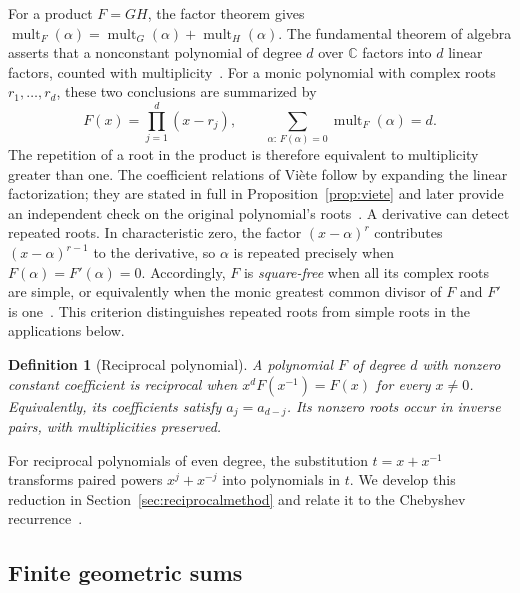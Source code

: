 \documentclass[11pt,a4paper]{article}
\numberwithin{equation}{section}
\theoremstyle{uprightpaper}
\newtheorem{definition}{Definition}[section]
\newcommand{\C}{\mathbb{C}}
\newcommand{\mult}{\operatorname{mult}}
\begin{document}
For a product $F=GH$, the factor theorem gives $\mult_F(\alpha)=\mult_G(\alpha)+\mult_H(\alpha)$. The fundamental theorem of algebra asserts that a nonconstant polynomial of degree $d$ over $\C$ factors into $d$ linear factors, counted with multiplicity~\cite{dummit2004,needham1997}. For a monic polynomial with complex roots $r_1,\ldots,r_d$, these two conclusions are summarized by
\begin{equation}\label{eq:fta-factorization}
 F(x)=\prod_{j=1}^{d}(x-r_j),\qquad
 \sum_{\alpha:\,F(\alpha)=0}\mult_F(\alpha)=d.
\end{equation}
The repetition of a root in the product is therefore equivalent to multiplicity greater than one. The coefficient relations of Vi\`ete follow by expanding the linear factorization; they are stated in full in Proposition~\ref{prop:viete} and later provide an independent check on the original polynomial's roots~\cite{barbeau1989}. A derivative can detect repeated roots. In characteristic zero, the factor $(x-\alpha)^r$ contributes $(x-\alpha)^{r-1}$ to the derivative, so $\alpha$ is repeated precisely when $F(\alpha)=F'(\alpha) = 0$. Accordingly, $F$ is \emph{square-free} when all its complex roots are simple, or equivalently when the monic greatest common divisor of $F$ and $F'$ is one~\cite[Section~13.5]{dummit2004}. This criterion distinguishes repeated roots from simple roots in the applications below.

\begin{definition}[Reciprocal polynomial]\label{def:reciprocal}
A polynomial $F$ of degree $d$ with nonzero constant coefficient is \emph{reciprocal} when $x^dF(x^{-1})=F(x)$ for every $x\neq0$. Equivalently, its coefficients satisfy $a_j=a_{d-j}$. Its nonzero roots occur in inverse pairs, with multiplicities preserved.
\end{definition}

For reciprocal polynomials of even degree, the substitution $t=x+x^{-1}$ transforms paired powers $x^j+x^{-j}$ into polynomials in $t$. We develop this reduction in Section~\ref{sec:reciprocalmethod} and relate it to the Chebyshev recurrence~\cite{needham1997}.


\subsection{Finite geometric sums}\label{subsec:geometric}
\end{document}
